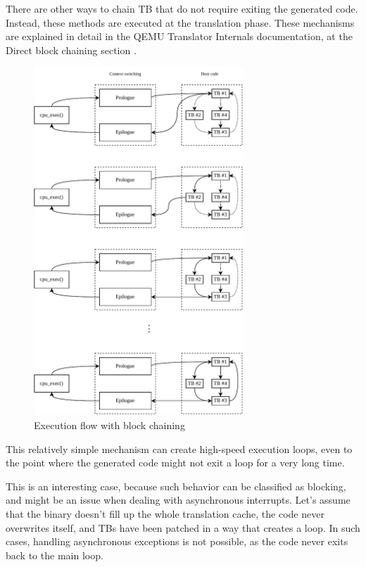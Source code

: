There are other ways to chain TB that do not require exiting the generated code. Instead, these methods are executed at the
translation phase. These mechanisms are explained in detail in the QEMU Translator Internals documentation,
at the Direct block chaining section \cite{QemuDocsChaining}.

\pagebreak

\begin{figure}[h]
	\centering
    \label{fig:qemu-execution-with-blocks}
	\includegraphics[width=0.7\textwidth]{figures/TbExecution-Chain.pdf}
	\caption{Execution flow with block chaining}
\end{figure}

\noindent
This relatively simple mechanism can create high-speed execution loops, even to the point where the generated code
might not exit a loop for a very long time.

This is an interesting case, because such behavior can be classified as
blocking, and might be an issue when dealing with asynchronous interrupts. Let's assume that the binary doesn't fill up
the whole translation cache, the code never overwrites itself, and TBs have been patched in a way that creates a
loop. In such cases, handling asynchronous exceptions is not possible, as the code never exits back to the main loop.

